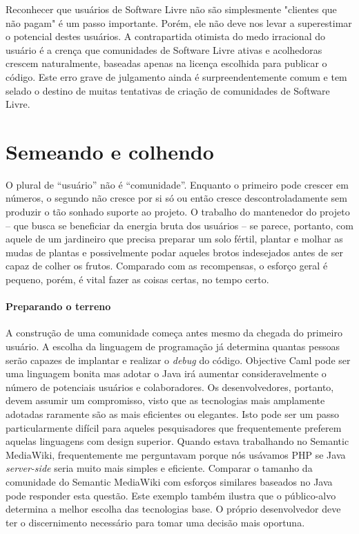 Reconhecer que usuários de Software Livre não são simplesmente "clientes que não pagam" é
um passo importante. Porém, ele não deve nos levar a superestimar o potencial destes
usuários. A contrapartida otimista do medo irracional do usuário é a crença que comunidades
de Software Livre ativas e acolhedoras crescem naturalmente, baseadas apenas na licença
escolhida para publicar o código. Este erro grave de julgamento ainda é surpreendentemente
comum e tem selado o destino de muitas tentativas de criação de comunidades de Software Livre.

\section*{Semeando e colhendo}

O plural de ``usuário'' não é ``comunidade''. Enquanto o primeiro pode crescer em números,
o segundo não cresce por si só ou então cresce descontroladamente sem produzir o tão
sonhado suporte ao projeto. O trabalho do mantenedor do projeto -- que busca se beneficiar
da energia bruta dos usuários -- se parece, portanto, com aquele de um jardineiro que precisa
preparar um solo fértil, plantar e molhar as mudas de plantas e possivelmente podar aqueles
brotos indesejados antes de ser capaz de colher os frutos. Comparado com as recompensas, o
esforço geral é pequeno, porém, é vital fazer as coisas certas, no tempo certo.

\paragraph*{Preparando o terreno}
A construção de uma comunidade começa antes mesmo da chegada do primeiro usuário. A escolha
da linguagem de programação já determina quantas pessoas serão capazes de implantar e realizar
o \textit{debug} do código. Objective Caml pode ser uma linguagem bonita mas adotar o Java
irá aumentar consideravelmente o número de potenciais usuários e colaboradores.
Os desenvolvedores, portanto, devem assumir um compromisso, visto que as tecnologias
mais amplamente adotadas raramente são as mais eficientes ou elegantes. Isto pode ser um passo
particularmente difícil para aqueles pesquisadores que frequentemente preferem aquelas linguagens
com design superior. Quando estava trabalhando no Semantic MediaWiki, frequentemente me perguntavam
porque nós usávamos PHP se Java \textit{server-side} seria muito mais simples e eficiente.
Comparar o tamanho da comunidade do Semantic MediaWiki com esforços similares baseados no Java pode
responder esta questão. Este exemplo também ilustra que o público-alvo determina a melhor escolha
das tecnologias base. O próprio desenvolvedor deve ter o discernimento necessário para tomar uma
decisão mais oportuna.

